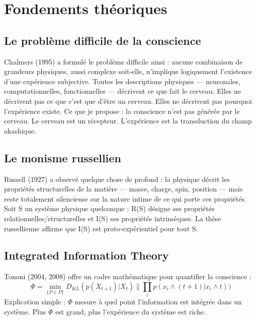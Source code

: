 \section{Fondements théoriques}
\subsection{Le problème difficile de la conscience}
Chalmers (1995) a formulé le problème difficile ainsi : aucune combinaison de grandeurs physiques, aussi complexe soit-elle, n'implique logiquement l'existence d'une expérience subjective. Toutes les descriptions physiques --- neuronales, computationnelles, fonctionnelles --- décrivent ce que fait le cerveau. Elles ne décrivent pas ce que c'est que d'être un cerveau. Elles ne décrivent pas pourquoi l'expérience existe. Ce que je propose : la conscience n'est pas générée par le cerveau. Le cerveau est un récepteur. L'expérience est la transduction du champ akashique.

\subsection{Le monisme russellien}
Russell (1927) a observé quelque chose de profond : la physique décrit les propriétés structurelles de la matière --- masse, charge, spin, position --- mais reste totalement silencieuse sur la nature intime de ce qui porte ces propriétés. Soit S un système physique quelconque : R(S) désigne ses propriétés relationnelles/structurelles et I(S) ses propriétés intrinsèques. La thèse russellienne affirme que I(S) est proto-expérientiel pour tout S.

\subsection{Integrated Information Theory}
Tononi (2004, 2008) offre un cadre mathématique pour quantifier la conscience :
\begin{equation}
\Phi = \min_{\{P \in P\}} D_{KL}(p(X_{t+1})|X_{t}) \parallel \prod_{i} p(x_{i} \land (t+1)|x_{i} \land t))
\end{equation}
Explication simple : $\Phi$ mesure à quel point l'information est intégrée dans un système. Plus $\Phi$ est grand, plus l'expérience du système est riche.

